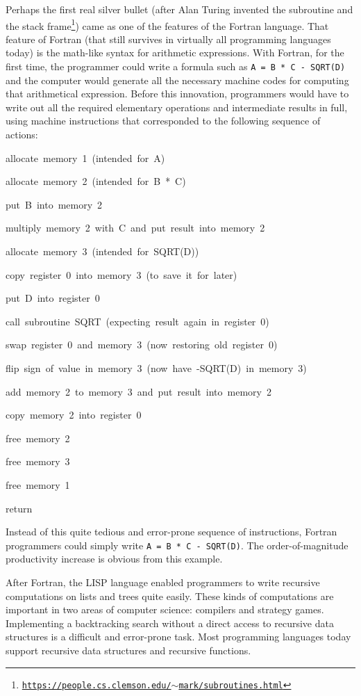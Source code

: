 Perhaps the first real silver bullet (after Alan Turing invented the
subroutine and the stack frame\footnote{\texttt{\href{https://people.cs.clemson.edu/~mark/subroutines.html}{https://people.cs.clemson.edu/$\sim$mark/subroutines.html}}})
came as one of the features of the Fortran language. That feature
of Fortran (that still survives in virtually all programming languages
today) is the math-like syntax for arithmetic expressions. With Fortran,
for the first time, the programmer could write a formula such as \lstinline!A = B * C - SQRT(D)!
and the computer would generate all the necessary machine codes for
computing that arithmetical expression. Before this innovation, programmers
would have to write out all the required elementary operations and
intermediate results in full, using machine instructions that corresponded
to the following sequence of actions:
\begin{lyxcode}
allocate~memory~1~(intended~for~A)

allocate~memory~2~(intended~for~B~{*}~C)

put~B~into~memory~2

multiply~memory~2~with~C~and~put~result~into~memory~2

allocate~memory~3~(intended~for~SQRT(D))

copy~register~0~into~memory~3~(to~save~it~for~later)

put~D~into~register~0

call~subroutine~SQRT~(expecting~result~again~in~register~0)

swap~register~0~and~memory~3~(now~restoring~old~register~0)

flip~sign~of~value~in~memory~3~(now~have~-SQRT(D)~in~memory~3)

add~memory~2~to~memory~3~and~put~result~into~memory~2

copy~memory~2~into~register~0

free~memory~2

free~memory~3

free~memory~1

return
\end{lyxcode}
Instead of this quite tedious and error-prone sequence of instructions,
Fortran programmers could simply write \lstinline!A = B * C - SQRT(D)!.
The order-of-magnitude productivity increase is obvious from this
example.

After Fortran, the LISP language enabled programmers to write recursive
computations on lists and trees quite easily. These kinds of computations
are important in two areas of computer science: compilers and strategy
games. Implementing a backtracking search without a direct access
to recursive data structures is a difficult and error-prone task.
Most programming languages today support recursive data structures
and recursive functions.

